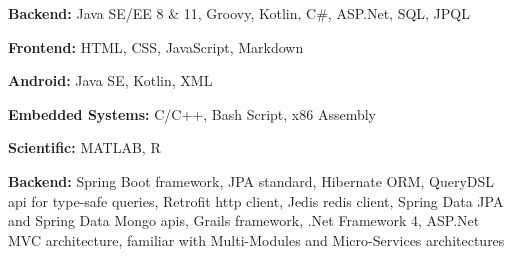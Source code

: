 

\begin{cvskills}

\cvskill
  {} %
  { %
    \begin{cvitems} %
      \item {\textbf{Backend:} Java SE/EE 8 \& 11, Groovy, Kotlin, C\#, ASP.Net, SQL, JPQL}
      \item {\textbf{Frontend:} HTML, CSS, JavaScript, Markdown}
      \item {\textbf{Android:} Java SE, Kotlin, XML}
      \item {\textbf{Embedded Systems:} C/C++, Bash Script, x86 Assembly}
      \item {\textbf{Scientific:} MATLAB, R}
    \end{cvitems}
  } 
  
\cvskill
  {} %
  { %
    \begin{cvitems} %
      \item {\textbf{Backend:} Spring Boot framework, JPA standard, Hibernate ORM, QueryDSL api for type-safe queries, Retrofit http client, Jedis redis client, Spring Data JPA and Spring Data Mongo apis, Grails framework, .Net Framework 4, ASP.Net MVC architecture, familiar with Multi-Modules and Micro-Services architectures}
    \end{cvitems}
  }

\end{cvskills}
